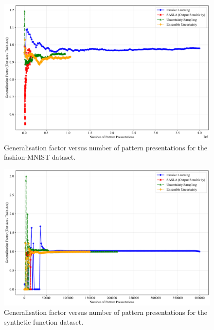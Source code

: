 \documentclass[10pt, conference]{IEEEtran}
\begin{document}
\begin{figure}[!t]
	\centering
	\includegraphics[width=\linewidth]{../results/fashion/generalization_factor_vs_presentations.pdf}
	\caption{Generalisation factor versus number of pattern presentations for the fashion-MNIST dataset.}
	\label{fig:gf_fashion}
\end{figure}

\begin{figure}[!t]
	\centering
	\includegraphics[width=\linewidth]{../results/synfunc/generalization_factor_vs_presentations.pdf}
	\caption{Generalisation factor versus number of pattern presentations for the synthetic function dataset.}
	\label{fig:gf_synfunc}
\end{figure}
\end{document}
